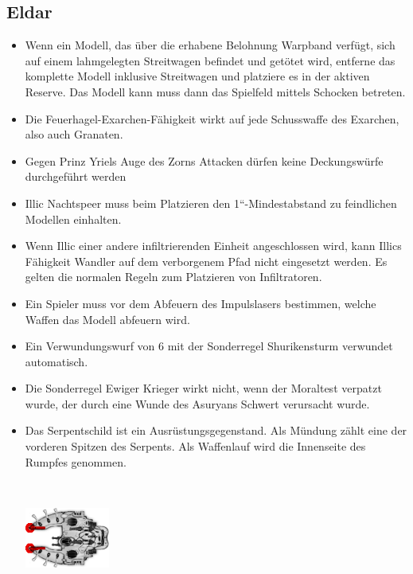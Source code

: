 \subsection{Eldar}

\begin{itemize}

 \item Wenn ein Modell, das über die erhabene Belohnung Warpband verfügt, sich
  auf einem lahmgelegten Streitwagen befindet und getötet wird, entferne das
  komplette Modell inklusive Streitwagen und platziere es in der aktiven
  Reserve. Das Modell kann muss dann das Spielfeld mittels Schocken betreten.

 \item Die Feuerhagel-Exarchen-Fähigkeit wirkt auf jede Schusswaffe des
  Exarchen, also auch Granaten.

 \item Gegen Prinz Yriels Auge des Zorns Attacken dürfen keine Deckungswürfe
  durchgeführt werden

 \item Illic Nachtspeer muss beim Platzieren den 1“-Mindestabstand zu
  feindlichen Modellen einhalten.

 \item Wenn Illic einer andere infiltrierenden Einheit angeschlossen wird, kann
  Illics Fähigkeit Wandler auf dem verborgenem Pfad nicht eingesetzt werden. Es
  gelten die normalen Regeln zum Platzieren von Infiltratoren.

 \item Ein Spieler muss vor dem Abfeuern des Impulslasers bestimmen, welche
  Waffen das Modell abfeuern wird.

 \item Ein Verwundungswurf von 6 mit der Sonderregel Shurikensturm verwundet
  automatisch.

 \item Die Sonderregel Ewiger Krieger wirkt nicht, wenn der Moraltest verpatzt
  wurde, der durch eine Wunde des Asuryans Schwert verursacht wurde.

 \item 
  \begin{minipage}[t]{0.65\textwidth}
Das Serpentschild ist ein Ausrüstungsgegenstand. Als Mündung zählt eine der
vorderen Spitzen des Serpents. Als Waffenlauf wird die Innenseite des Rumpfes
genommen. 
\end{minipage} \
  \begin{minipage}[t]{0.35\textwidth}
\includegraphics[height=2cm, valign=T, margin=0.0cm]{Bilder/serpent_transparent.png}
\end{minipage}


\end{itemize}
